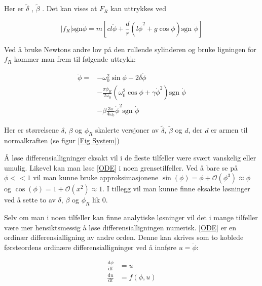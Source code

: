 \documentclass[5p]{elsarticle}
\newcommand{\dd}[2]{\frac{\mathrm{d}{#1}}{\mathrm{d}{#2}}} %
\begin{document}
Her er \(\tilde{\delta}\) , \(\tilde{\beta}\) .
Det kan vises at \(F_R\) kan uttrykkes ved

\begin{equation}
	|f_R|\text{sgn}\dot{\phi} =
	m\left[
		cl\ddot{\phi}+\frac{d}{r}
		\left(l\dot{\phi}^2 + g\cos\phi\right)
		\text{sgn }\dot{\phi}
	\right]
\end{equation}

Ved å bruke Newtons andre lov på den rullende sylinderen 
og bruke ligningen for \(f_R\) kommer man frem til følgende uttrykk:

\begin{equation}
	\begin{split}
		\label{ODE}	
		\ddot{\phi} = 	
		&- \omega_0^2\sin\phi - 2\delta\dot{\phi}	\\
		&- \frac{\pi\phi_R}{2\omega_0}
		\left(\omega_0^2\cos\phi + \gamma\dot{\phi}^2\right) \text{sgn } \dot{\phi} \\
		&- \beta \frac{3\pi}{4\omega_0}\dot{\phi}^2\text{sgn }\dot{\phi} 
	\end{split}
\end{equation}

Her er størrelsene \(\delta\), \(\beta\) og \(\phi_R\) skalerte versjoner av 
\(\tilde{\delta}\), \(\tilde{\beta}\) og \(d\), der \(d\) er armen til normalkraften (se figur \ref{Fig System})


Å løse differensialligninger eksakt vil i de fleste tilfeller være svært vanskelig eller umulig.
Likevel kan man løse \eqref{ODE} i noen grensetilfeller. Ved å bare se på \(\phi << 1\) vil man kunne
bruke approksimasjonene 
\(\sin(\phi) = \phi + \mathcal{O}(\phi^3) \approx \phi\) og 
\(\cos(\phi) = 1 + \mathcal{O}(x^2) \approx 1\).
I tillegg vil man kunne finne eksakte løsninger ved å sette to av \(\delta\), \(\beta\) og \(\phi_R\) lik 0.
\par
Selv om man i noen tilfeller kan finne analytiske løsninger 
vil det i mange tilfeller være mer hensiktsmessig å løse differensialligningen numerisk.
\eqref{ODE} er en ordinær differensialligning av andre orden. 
Denne kan skrives som to koblede førsteordens ordinære differensialligninger ved å innføre \(u = \dot{\phi}\):

\begin{subequations}
	\begin{align}
		\dd{\phi}{t} & = u \\
		\dd{u}{t}    & = f(\phi, u) \\
	\end{align}
\end{subequations}
\end{document}
